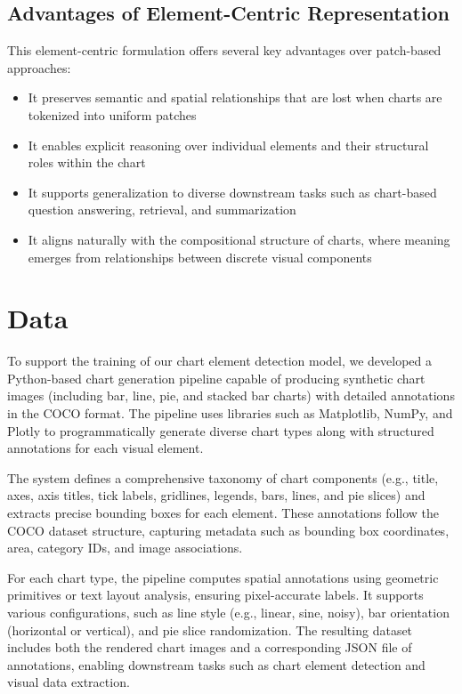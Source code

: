 \documentclass[11pt]{article}
\begin{document}
\subsection*{Advantages of Element-Centric Representation}

This element-centric formulation offers several key advantages over patch-based approaches:
\begin{itemize}
    \item It preserves semantic and spatial relationships that are lost when charts are tokenized into uniform patches
    \item It enables explicit reasoning over individual elements and their structural roles within the chart
    \item It supports generalization to diverse downstream tasks such as chart-based question answering, retrieval, and summarization
    \item It aligns naturally with the compositional structure of charts, where meaning emerges from relationships between discrete visual components
\end{itemize}


\section{Data}

To support the training of our chart element detection model, we developed a Python-based chart generation pipeline capable of producing synthetic chart images (including bar, line, pie, and stacked bar charts) with detailed annotations in the COCO format. The pipeline uses libraries such as Matplotlib, NumPy, and Plotly to programmatically generate diverse chart types along with structured annotations for each visual element.

The system defines a comprehensive taxonomy of chart components (e.g., title, axes, axis titles, tick labels, gridlines, legends, bars, lines, and pie slices) and extracts precise bounding boxes for each element. These annotations follow the COCO dataset structure, capturing metadata such as bounding box coordinates, area, category IDs, and image associations.

For each chart type, the pipeline computes spatial annotations using geometric primitives or text layout analysis, ensuring pixel-accurate labels. It supports various configurations, such as line style (e.g., linear, sine, noisy), bar orientation (horizontal or vertical), and pie slice randomization. The resulting dataset includes both the rendered chart images and a corresponding JSON file of annotations, enabling downstream tasks such as chart element detection and visual data extraction.
\end{document}
